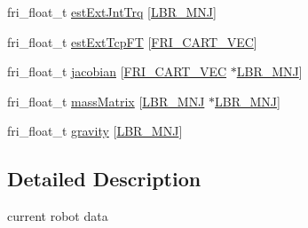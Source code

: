 \begin{DoxyCompactItemize}
fri\-\_\-float\-\_\-t \hyperlink{structtFriRobotData_aa2acaa7fa59afaf684164aaa57652e26}{est\-Ext\-Jnt\-Trq} \mbox{[}\hyperlink{friComm_8h_a14d10dff3deb8105d27539540b23ed6e}{\-L\-B\-R\-\_\-\-M\-N\-J}\mbox{]}
\item 
fri\-\_\-float\-\_\-t \hyperlink{structtFriRobotData_a800976e07d320eb1e96c16b0247535a2}{est\-Ext\-Tcp\-F\-T} \mbox{[}\hyperlink{friComm_8h_a1286cc3f1315de7fac9fed0e6e4b98cb}{\-F\-R\-I\-\_\-\-C\-A\-R\-T\-\_\-\-V\-E\-C}\mbox{]}
\item 
fri\-\_\-float\-\_\-t \hyperlink{structtFriRobotData_ac8e9fe5c4f22e7bfbc4715ff952aea6e}{jacobian} \mbox{[}\hyperlink{friComm_8h_a1286cc3f1315de7fac9fed0e6e4b98cb}{\-F\-R\-I\-\_\-\-C\-A\-R\-T\-\_\-\-V\-E\-C} $\ast$\hyperlink{friComm_8h_a14d10dff3deb8105d27539540b23ed6e}{\-L\-B\-R\-\_\-\-M\-N\-J}\mbox{]}
\item 
fri\-\_\-float\-\_\-t \hyperlink{structtFriRobotData_a864e694c1bd10f4240c0973649ea1bbd}{mass\-Matrix} \mbox{[}\hyperlink{friComm_8h_a14d10dff3deb8105d27539540b23ed6e}{\-L\-B\-R\-\_\-\-M\-N\-J} $\ast$\hyperlink{friComm_8h_a14d10dff3deb8105d27539540b23ed6e}{\-L\-B\-R\-\_\-\-M\-N\-J}\mbox{]}
\item 
fri\-\_\-float\-\_\-t \hyperlink{structtFriRobotData_a5f379bf87bcedf36928c76f66f29450f}{gravity} \mbox{[}\hyperlink{friComm_8h_a14d10dff3deb8105d27539540b23ed6e}{\-L\-B\-R\-\_\-\-M\-N\-J}\mbox{]}
\end{DoxyCompactItemize}


\subsection{\-Detailed \-Description}
current robot data 

